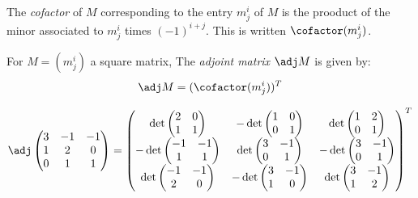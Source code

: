 The \emph{cofactor} of $M$ corresponding to the entry $m^i_j$ of $M$ 
is the prooduct of the minor associated to $m^i_j$
times $(-1)^{i+j}$.  This is written $\cofactor(m^i_j)$.

\begin{definition}
For $M=(m^i_j)$ a square matrix, The \emph{adjoint matrix} $\adj M$ is given by:
\[
\adj M = (\cofactor(m^i_j))^T
\]
\end{definition}

\begin{example}
\[
\adj \begin{pmatrix}
3 & -1 & -1 \\
1 & 2 & 0 \\
0 & 1 & 1 \\
\end{pmatrix}
=
\begin{pmatrix}
\det \begin{pmatrix}
2 & 0 \\
1 & 1 
\end{pmatrix}
& -\det \begin{pmatrix}
1 & 0 \\
0 & 1 
\end{pmatrix}
& \det \begin{pmatrix}
1 & 2 \\
0 & 1 
\end{pmatrix}
\\
-\det \begin{pmatrix}
-1 & -1 \\
1 & 1 
\end{pmatrix}
& \det \begin{pmatrix}
3 & -1 \\
0 & 1 
\end{pmatrix}
& -\det \begin{pmatrix}
3 & -1 \\
0 & 1 
\end{pmatrix}
\\
\det \begin{pmatrix}
-1 & -1 \\
2 & 0 
\end{pmatrix}
& -\det \begin{pmatrix}
3 & -1 \\
1 & 0 
\end{pmatrix}
& \det \begin{pmatrix}
3 & -1 \\
1 & 2 
\end{pmatrix}
\\
\end{pmatrix}^T
\]
\end{example}

